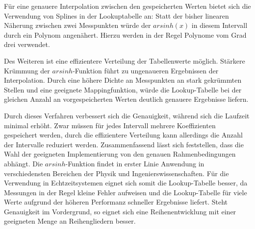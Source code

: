 \documentclass[course=erap] {aspdoc}
\begin{document}
    Für eine genauere Interpolation zwischen den gespeicherten Werten bietet sich die Verwendung von Splines in der Lookuptabelle an:
    Statt der bisher linearen Näherung zwischen zwei Messpunkten würde der $arsinh(x)$ in diesem Intervall durch ein Polynom angenähert.
    Hierzu werden in der Regel Polynome vom Grad drei verwendet.~\cite{splines}

    Des Weiteren ist eine effizientere Verteilung der Tabellenwerte möglich.
    Stärkere Krümmung der $arsinh$-Funktion führt zu ungenaueren Ergebnissen der Interpolation.
    Durch eine höhere Dichte an Messpunkten an stark gekrümmten Stellen und eine geeignete Mappingfunktion, würde die Lookup-Tabelle bei der gleichen Anzahl an vorgespeicherten Werten deutlich genauere Ergebnisse liefern.

    Durch dieses Verfahren verbessert sich die Genauigkeit, während sich die Laufzeit minimal erhöht.
    Zwar müssen für jedes Intervall mehrere Koeffizienten gespeichert werden, durch die effizientere Verteilung kann allerdings die Anzahl der Intervalle reduziert werden. 
    \newline
    \newline
    Zusammenfassend lässt sich feststellen, dass die Wahl der geeigneten Implementierung von den genauen Rahmenbedingungen abhängt.
    Die $arsinh$-Funktion findet in erster Linie Anwendung in verschiedensten Bereichen der Physik und Ingenierswissenschaften.
    Für die Verwendung in Echtzeitsystemen eignet sich somit die Lookup-Tabelle besser, da Messungen in der Regel kleine Fehler aufweisen und die Lookup-Tabelle für viele Werte aufgrund der höheren Performanz schneller Ergebnisse liefert.
    Steht Genauigkeit im Vordergrund, so eignet sich eine Reihenentwicklung mit einer geeigneten Menge an Reihengliedern besser.

    \newpage

    
    
\end{document}
